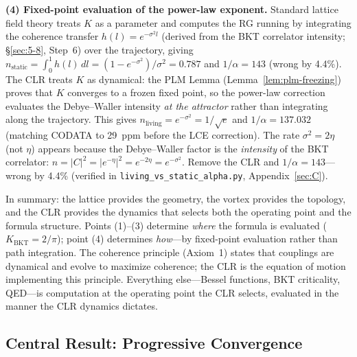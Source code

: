 \documentclass[aps,prd,onecolumn,superscriptaddress,floatfix,12pt]{revtex4-2}
\newcommand{\KBKT}{K_{\text{BKT}}}
\begin{document}
\textbf{(4) Fixed-point evaluation of the power-law exponent.} Standard lattice field theory treats $K$ as a parameter and computes the RG running by integrating the coherence transfer $h(l) = e^{-\sigma^2 l}$ (derived from the BKT correlator intensity; \S\ref{sec:5-8}, Step~6) over the trajectory, giving $n_{\text{static}} = \int_0^1 h(l)\,dl = (1 - e^{-\sigma^2})/\sigma^2 = 0.787$ and $1/\alpha = 143$ (wrong by 4.4\%).  The CLR treats $K$ as dynamical: the PLM Lemma (Lemma~\ref{lem:plm-freezing}) proves that $K$ converges to a frozen fixed point, so the power-law correction evaluates the Debye--Waller intensity \emph{at the attractor} rather than integrating along the trajectory.  This gives $n_{\text{living}} = e^{-\sigma^2} = 1/\sqrt{e}$ and $1/\alpha = 137.032$ (matching CODATA to 29~ppm before the LCE correction).  The rate $\sigma^2 = 2\eta$ (not $\eta$) appears because the Debye--Waller factor is the \emph{intensity} of the BKT correlator: $n = |C|^2 = |e^{-\eta}|^2 = e^{-2\eta} = e^{-\sigma^2}$.  Remove the CLR and $1/\alpha = 143$---wrong by 4.4\% (verified in \texttt{living\_vs\_static\_alpha.py}, Appendix~\ref{sec:C}).

\medskip

In summary: the lattice provides the geometry, the vortex provides the topology, and the CLR provides the dynamics that selects both the operating point and the formula structure.  Points (1)--(3) determine \emph{where} the formula is evaluated ($\KBKT = 2/\pi$); point (4) determines \emph{how}---by fixed-point evaluation rather than path integration.  The coherence principle (Axiom~1) states that couplings are dynamical and evolve to maximize coherence; the CLR is the equation of motion implementing this principle.  Everything else---Bessel functions, BKT criticality, QED---is computation at the operating point the CLR selects, evaluated in the manner the CLR dynamics dictates.

\subsection*{Central Result: Progressive Convergence}
\end{document}
